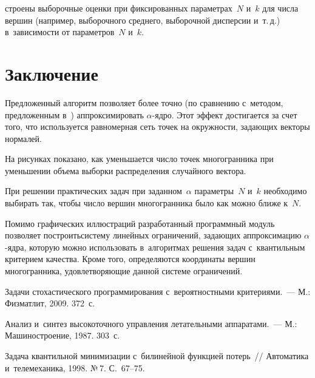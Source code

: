 \begin{multicols}{2}

\noindent
стро\-ены выборочные оценки 
при фиксированных
 па\-ра\-мет\-рах~$N$ и~$k$   для числа вершин (например, выборочного 
среднего, выборочной дис\-пер\-сии и~т.\,д.) в~за\-ви\-си\-мости от па\-ра\-мет\-ров~$N$ и~$k.$

\vspace*{-9pt}

\section{Заключение }

Предложенный алгоритм позволяет более точно (по сравнению с~методом, предложенным 
в~\cite{vaskan}) аппроксимировать
 $\alpha$-яд\-ро. Этот эффект достигается за счет того, что используется 
 равномерная сеть точек на окруж\-ности, за\-да\-ющих
 векторы нор\-малей.
 {
 
 }

На рисунках показано, как уменьшается число точек многогранника при 
уменьшении объема выборки распределения случайного вектора.

При решении практических задач при заданном~$\alpha$ па\-ра\-мет\-ры~$N$ и~$k$  
необходимо выбирать так, чтобы чис\-ло вершин многогранника было как можно ближе к~$N.$

Помимо графических иллюстраций разработанный программный модуль позволяет 
построить\linebreak сис\-те\-му линейных ограничений, за\-да\-ющих аппроксимацию $\alpha$-яд\-ра, 
которую можно использовать в~алгоритмах решения задач с~квантильным критерием 
качества. Кроме того, определяются координаты вер\-шин многогранника, 
удовле\-тво\-ря\-ющие данной сис\-те\-ме ограничений.



{\small\frenchspacing
 {%
 \begin{thebibliography}{99}

Задачи стохастического программирования с~вероятностными критериями.~--- 
М.: Физматлит, 2009. 372~с.

Анализ и~синтез высокоточного управления летательными аппаратами.~--- 
М.: Машиностроение, 1987. 303~с.

Задача квантильной минимизации с~билинейной функцией потерь~// Автоматика
и~телемеханика, 1998. 
№\,7. С.~67--75.


\end{thebibliography}}}
\end{multicols}
